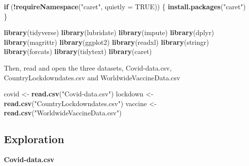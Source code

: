 \documentclass[
]{article}
\newenvironment{Shaded}{\begin{snugshade}}{\end{snugshade}}
\newcommand{\AttributeTok}[1]{\textcolor[rgb]{0.13,0.29,0.53}{#1}}
\newcommand{\ConstantTok}[1]{\textcolor[rgb]{0.56,0.35,0.01}{#1}}
\newcommand{\ControlFlowTok}[1]{\textcolor[rgb]{0.13,0.29,0.53}{\textbf{#1}}}
\newcommand{\FunctionTok}[1]{\textcolor[rgb]{0.13,0.29,0.53}{\textbf{#1}}}
\newcommand{\NormalTok}[1]{#1}
\newcommand{\OtherTok}[1]{\textcolor[rgb]{0.56,0.35,0.01}{#1}}
\newcommand{\SpecialCharTok}[1]{\textcolor[rgb]{0.81,0.36,0.00}{\textbf{#1}}}
\newcommand{\StringTok}[1]{\textcolor[rgb]{0.31,0.60,0.02}{#1}}
\begin{document}
\begin{Shaded}
\begin{Highlighting}[]
\ControlFlowTok{if}\NormalTok{ (}\SpecialCharTok{!}\FunctionTok{requireNamespace}\NormalTok{(}\StringTok{"caret"}\NormalTok{, }\AttributeTok{quietly =} \ConstantTok{TRUE}\NormalTok{)) \{}
  \FunctionTok{install.packages}\NormalTok{(}\StringTok{"caret"}\NormalTok{)}
\NormalTok{\}}

\FunctionTok{library}\NormalTok{(tidyverse)}
\FunctionTok{library}\NormalTok{(lubridate)}
\FunctionTok{library}\NormalTok{(impute)}
\FunctionTok{library}\NormalTok{(dplyr)}
\FunctionTok{library}\NormalTok{(magrittr)}
\FunctionTok{library}\NormalTok{(ggplot2)}
\FunctionTok{library}\NormalTok{(readxl)}
\FunctionTok{library}\NormalTok{(stringr)}
\FunctionTok{library}\NormalTok{(forcats)}
\FunctionTok{library}\NormalTok{(tidytext)}
\FunctionTok{library}\NormalTok{(caret)}
\end{Highlighting}
\end{Shaded}

Then, read and open the three datasets, Covid-data.csv,
CountryLockdowndates.csv and WorldwideVaccineData.csv

\begin{Shaded}
\begin{Highlighting}[]
\NormalTok{covid }\OtherTok{\textless{}{-}} \FunctionTok{read.csv}\NormalTok{(}\StringTok{"Covid{-}data.csv"}\NormalTok{)}
\NormalTok{lockdown }\OtherTok{\textless{}{-}} \FunctionTok{read.csv}\NormalTok{(}\StringTok{"CountryLockdowndates.csv"}\NormalTok{)}
\NormalTok{vaccine }\OtherTok{\textless{}{-}} \FunctionTok{read.csv}\NormalTok{(}\StringTok{"WorldwideVaccineData.csv"}\NormalTok{)}
\end{Highlighting}
\end{Shaded}

\subsection{Exploration}\label{exploration}

\textbf{Covid-data.csv}
\end{document}
